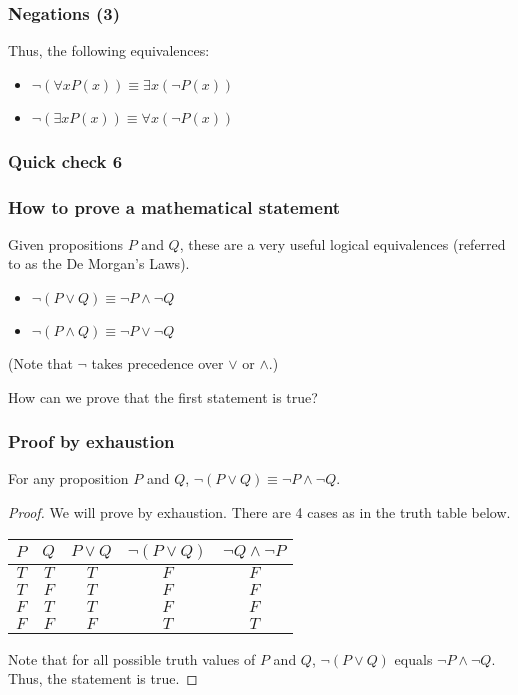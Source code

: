 \begin{frame}\frametitle{Negations (3)}
  Thus, the following equivalences:

  \begin{itemize}
  \item $\neg(\forall x P(x)) \equiv \exists x (\neg P(x))$
  \item $\neg(\exists x P(x)) \equiv \forall x (\neg P(x))$
  \end{itemize}
\end{frame}

\begin{frame}\frametitle{Quick check 6}
\end{frame}

\begin{frame}\frametitle{How to prove a mathematical statement}
  Given propositions $P$ and $Q$, these are a very useful logical
  equivalences (referred to as the De Morgan's Laws).

  \begin{itemize}
  \item $\neg (P\vee Q)\equiv \neg P \wedge \neg Q$
  \item $\neg (P\wedge Q)\equiv \neg P \vee \neg Q$
  \end{itemize}

  (Note that $\neg$ takes precedence over $\vee$ or $\wedge$.)

  \vspace{0.2in}
  
  How can we prove that the first statement is true?
\end{frame}

\begin{frame}\frametitle{Proof by exhaustion}
  \begin{tcolorbox}
    For any proposition $P$ and $Q$, $\neg (P\vee Q)\equiv \neg P
    \wedge \neg Q$.
  \end{tcolorbox}
  \begin{proof}
    We will prove by exhaustion.  There are 4 cases as in the truth
    table below.

    \vspace{0.1in}
    
    \begin{tabular}{|c|c||c|c|c|}
      \hline
      $P$ & $Q$ & $P\vee Q$ & $\neg(P\vee Q)$ & $\neg Q \wedge \neg P$ \\
      \hline
      $T$ & $T$ & $T$ & $F$ & $F$ \\
      $T$ & $F$ & $T$ & $F$ & $F$ \\
      $F$ & $T$ & $T$ & $F$ & $F$ \\
      $F$ & $F$ & $F$ & $T$ & $T$ \\
      \hline
    \end{tabular}

    \vspace{0.1in}

    Note that for all possible truth values of $P$ and $Q$, $\neg
    (P\vee Q)$ equals $\neg P \wedge \neg Q$.  Thus, the statement is
    true.
  \end{proof}
\end{frame}
